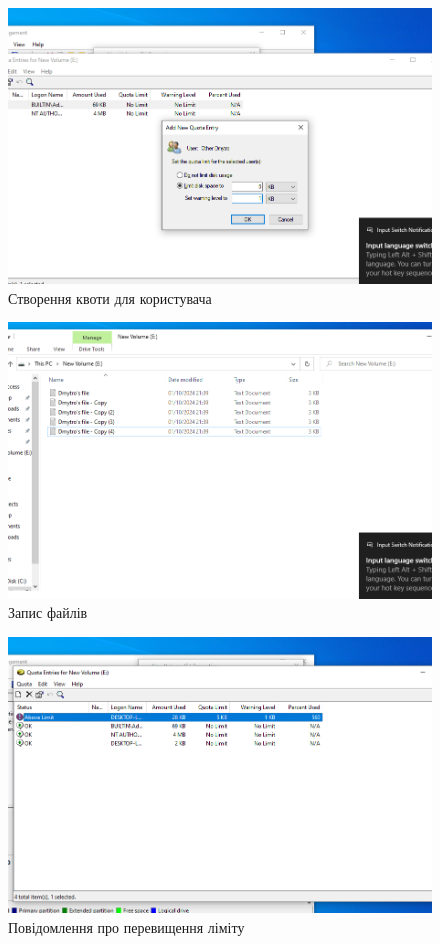 \documentclass[oneside,14pt]{extarticle}
\begin{document}
\begin{normalsize}
	\begin{figure}[H]
		\centering
		\includegraphics[width=\columnwidth]{9}
		\caption{Створення квоти для користувача}
	\end{figure}
	
	\begin{figure}[H]
		\centering
		\includegraphics[width=\columnwidth]{10}
		\caption{Запис файлів}
	\end{figure}
	
	\begin{figure}[H]
		\centering
		\includegraphics[width=\columnwidth]{11}
		\caption{Повідомлення про перевищення ліміту}
	\end{figure}
	

\end{normalsize}
\end{document}
